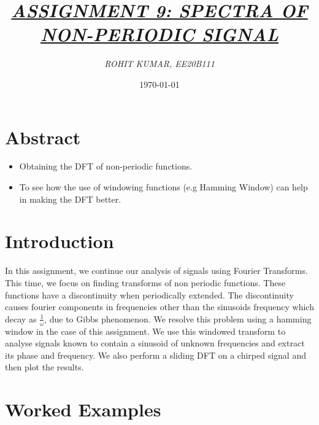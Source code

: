 \documentclass{article}
\title{\underline{\textit{\Large{ASSIGNMENT 9: SPECTRA OF NON-PERIODIC SIGNAL}}}}
\author{\textit{ROHIT KUMAR, EE20B111}}
\date{\today}
\begin{document}
\maketitle

\section{Abstract}
\begin{itemize}
\item Obtaining the DFT of non-periodic functions.
\item To see how the use of windowing functions (e.g Hamming Window) can help in making the DFT better.
\end{itemize}

\section{Introduction}
In this assignment, we continue our analysis of signals using Fourier Transforms. This time, we focus on finding transforms of non periodic functions. These functions have a discontinuity when periodically extended.\newline 
The discontinuity causes fourier components in frequencies other than the sinusoids frequency which decay as
\(\frac{1}{\omega}\), due to Gibbs phenomenon. We resolve this problem using a hamming window in the case of this assignment.\newline 
We use this windowed transform to analyse signals known to contain a sinusoid of unknown frequencies and extract its phase and frequency. We also perform a sliding DFT on a chirped signal and then plot the results.

\section {Worked Examples}
\end{document}

